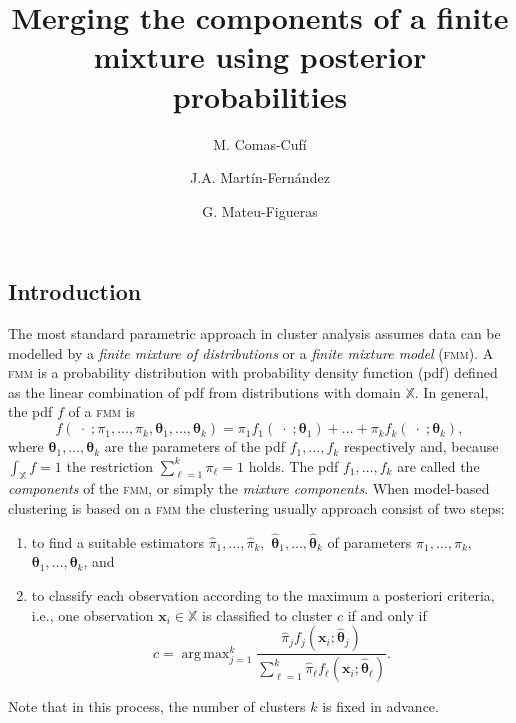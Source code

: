 \documentclass[10pt, a4paper]{article}
\title{Merging the components of a finite mixture using  posterior probabilities}
\author{M. Comas-Cufí \and J.A. Martín-Fernández \and G. Mateu-Figueras}
\DeclareMathOperator*{\argmax}{arg\,max}
\newcommand{\m}[1]{\boldsymbol{#1}}
\newcommand{\fmm}{\textsc{fmm}\xspace}
\begin{document}
\begin{spacing}{1.9}



\maketitle

\section{Introduction}


The most standard parametric approach in cluster analysis assumes data can be modelled by a \emph{finite mixture of distributions} or a \emph{finite mixture model} (\fmm). A \fmm is a probability distribution with probability density function (pdf) defined as the linear combination of pdf from distributions with domain $\mathbb{X}$. In general, the pdf $f$ of a \fmm is
\begin{equation}\label{mixt}
f(\;\cdot\; ; \pi_1, \dots, \pi_k, \m\theta_1, \dots, \m\theta_k) = \pi_1 f_1(\;\cdot\; ; \m\theta_1) + \dots + \pi_k f_k(\;\cdot\; ; \m\theta_k),
\end{equation}
where $\m\theta_1, \dots,  \m\theta_k$ are the parameters of the pdf $f_1, \dots, f_k$ respectively and, because $\int_{\mathbb{X}}f = 1$ the restriction $\sum_{\ell = 1}^k \pi_\ell = 1$ holds. The pdf $f_1, \dots, f_k$ are called the \emph{components} of the \fmm, or simply the \emph{mixture components}. When model-based clustering is based on a \fmm the clustering usually approach consist of two steps:
\begin{enumerate}
\item to find a suitable estimators $\hat{\pi}_1, \dots, \hat{\pi}_k,$ $\hat{\m\theta}_1, \dots, \hat{\m\theta}_k$ of parameters $\pi_1, \dots, \pi_k,$ $\m\theta_1, \dots, \m\theta_k$, and
\item to classify each observation according to the maximum a posteriori criteria, i.e., one observation $\m x_i \in \mathbb{X}$ is classified to cluster $c$ if and only if
\begin{equation}\label{map_criteria}
c=\argmax_{j=1}^k \frac{ \hat{\pi}_j f_j(\m x_i ; \hat{\m\theta}_j) }{\sum_{\ell=1}^k \hat{\pi}_\ell f_\ell(\m x_i ; \hat{\m\theta}_\ell) }.
\end{equation}
\end{enumerate}
Note that in this process, the number of clusters $k$ is fixed in advance. 


\end{spacing}
\end{document}
